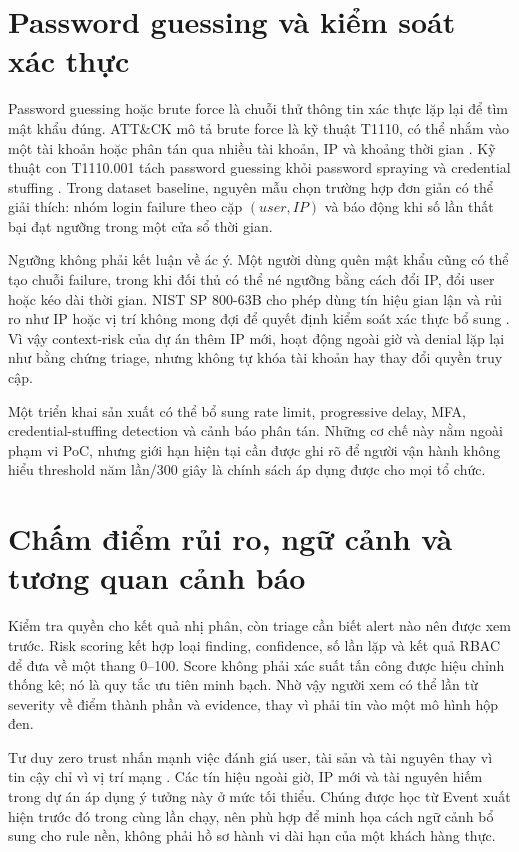 \section{Password guessing và kiểm soát xác thực}

Password guessing hoặc brute force là chuỗi thử thông tin xác thực lặp lại để
tìm mật khẩu đúng. ATT\&CK mô tả brute force là kỹ thuật T1110, có thể nhắm vào
một tài khoản hoặc phân tán qua nhiều tài khoản, IP và khoảng thời gian
\citep{MITRET1110}. Kỹ thuật con T1110.001 tách password guessing khỏi password
spraying và credential stuffing \citep{MITRET1110001}. Trong dataset baseline,
nguyên mẫu chọn trường hợp đơn
giản có thể giải thích: nhóm login failure theo cặp $(user, IP)$ và báo động
khi số lần thất bại đạt ngưỡng trong một cửa sổ thời gian.

Ngưỡng không phải kết luận về ác ý. Một người dùng quên mật khẩu cũng có thể
tạo chuỗi failure, trong khi đối thủ có thể né ngưỡng bằng cách đổi IP, đổi user
hoặc kéo dài thời gian. NIST SP 800-63B cho phép dùng tín hiệu gian lận và rủi
ro như IP hoặc vị trí không mong đợi để quyết định kiểm soát xác thực bổ sung
\citep{NIST2025SP80063B}. Vì vậy context-risk của dự án thêm IP mới, hoạt động
ngoài giờ và denial lặp lại như bằng chứng triage, nhưng không tự khóa tài khoản
hay thay đổi quyền truy cập.

Một triển khai sản xuất có thể bổ sung rate limit, progressive delay, MFA,
credential-stuffing detection và cảnh báo phân tán. Những cơ chế này nằm ngoài
phạm vi PoC, nhưng giới hạn hiện tại cần được ghi rõ để người vận hành không
hiểu threshold năm lần/300 giây là chính sách áp dụng được cho mọi tổ chức.

\section{Chấm điểm rủi ro, ngữ cảnh và tương quan cảnh báo}

Kiểm tra quyền cho kết quả nhị phân, còn triage cần biết alert nào nên được xem
trước. Risk scoring kết hợp loại finding, confidence, số lần lặp và kết quả
RBAC để đưa về một thang 0--100. Score không phải xác suất tấn công được hiệu
chỉnh thống kê; nó là quy tắc ưu tiên minh bạch. Nhờ vậy người xem có thể lần
từ severity về điểm thành phần và evidence, thay vì phải tin vào một mô hình
hộp đen.

Tư duy zero trust nhấn mạnh việc đánh giá user, tài sản và tài nguyên thay vì
tin cậy chỉ vì vị trí mạng \citep{Rose2020SP800207}. Các tín hiệu ngoài giờ, IP
mới và tài nguyên hiếm trong dự án áp dụng ý tưởng này ở mức tối thiểu. Chúng
được học từ Event xuất hiện trước đó trong cùng lần chạy, nên phù hợp để minh
họa cách ngữ cảnh bổ sung cho rule nền, không phải hồ sơ hành vi dài hạn của
một khách hàng thực.

